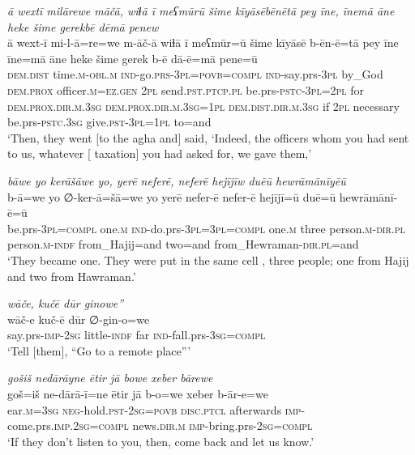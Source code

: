 \ea \label{BP.124}
\textit{ā wextī milārewe māčā, wiɫā ī meʕmūrū šime kīyāsēbēnētā pey īne, īnemā āne heke šime gerekbē dēmā penew} \\ 
\gll ā wext-ī mi-l-ā=re=we m-āč-ā wiɫā ī meʕmūr=ū šime kīyāsē b-ēn-ē=tā pey īne īne=mā āne heke šime gerek b-ē dā-ē=mā pene=ū \\ 
 \textsc{dem.dist} time\textsc{.m}\textsc{-obl}\textsc{.m} \textsc{ind-}go.\textsc{prs}\textsc{-3pl}\textsc{=\textsc{povb}}\textsc{=compl} \textsc{ind-}say.prs\textsc{-3pl} by\_God \textsc{dem.prox} officer\textsc{.m}\textsc{=ez.gen} \textsc{2pl} send\textsc{.pst}\textsc{.ptcp}\textsc{.pl} be.prs\textsc{-pstc}\textsc{-3pl}=\textsc{2pl} for \textsc{dem.prox}\textsc{.dir}\textsc{.m}\textsc{.3sg} \textsc{dem.prox}\textsc{.dir}\textsc{.m}\textsc{.3sg}\textsc{=\textsc{1pl}} \textsc{dem.dist}\textsc{.dir}\textsc{.m}\textsc{.3sg} if \textsc{2pl} necessary be.prs\textsc{-pstc}\textsc{.3sg} give\textsc{.pst}\textsc{-3pl}\textsc{=\textsc{1pl}} to=and \\ 
\glt `Then, they went [to the agha and] said, ‘Indeed, the officers whom you had sent to us, whatever [ taxation] you had asked for, we gave them,'
\z 
 
\ea \label{BP.141}
\textit{bāwe yo kerāšāwe yo, yerē neferē, neferē hejījīw duēū hewrāmānīyēū} \\ 
\gll b-ā=we yo ∅-ker-ā=šā=we yo yerē nefer-ē nefer-ē hejījī=ū duē=ū hewrāmānī-ē=ū \\ 
 be.prs\textsc{-3pl}\textsc{=compl} one\textsc{.m} \textsc{ind-}do.prs\textsc{-3pl}\textsc{=3pl}\textsc{=compl} one\textsc{.m} three person\textsc{.m}\textsc{-dir}\textsc{.pl} person\textsc{.m}\textsc{-indf} from\_Hajij=and two=and from\_Hewraman\textsc{-dir}\textsc{.pl}=and \\ 
\glt `They became one. They were put in the same cell , three people; one from Hajij and two from Hawraman.'
\z 
 
\ea \label{BP.162}
\textit{wāče, kučē dūr ginowe”} \\ 
\gll wāč-e kuč-ē dūr ∅-gin-o=we \\ 
 say.prs-\textsc{imp-}\textsc{2sg} little\textsc{-indf} far \textsc{ind-}fall.prs\textsc{-3sg}\textsc{=compl} \\ 
\glt `Tell [them], “Go to a remote place”'
\z 
 
\ea \label{BP.164}
\textit{gošiš nedārāyne ētir jā bowe xeber bārewe} \\ 
\gll goš=iš ne-dārā-ī=ne ētir jā b-o=we xeber b-ār-e=we \\ 
 ear\textsc{.m}\textsc{=3sg} \textsc{neg-}hold\textsc{.pst}-\textsc{2sg}\textsc{=\textsc{povb}} \textsc{disc.ptcl} afterwards \textsc{imp-}come.prs\textsc{.imp}\textsc{.\textsc{2sg}}\textsc{=compl} news\textsc{.dir}\textsc{.m} \textsc{imp-}bring.prs-\textsc{2sg}\textsc{=compl} \\ 
\glt `If they don’t listen to you, then, come back and let us know.'
\z 
 
